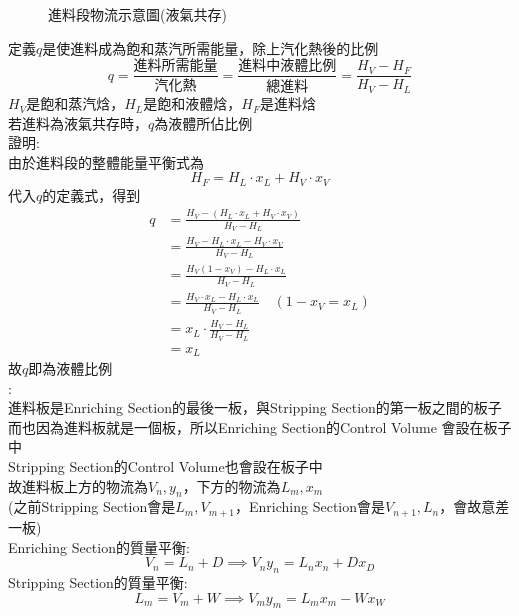 \documentclass[../main.tex]{subfiles}
\begin{document}
\begin{itemize}
\begin{itemize}
\begin{figure}[H]
      \caption{進料段物流示意圖(液氣共存)}
    \end{figure}
    定義$q$是使進料成為飽和蒸汽所需能量，除上汽化熱後的比例
    \begin{equation}
      q = \frac{\text{進料所需能量}}{\text{汽化熱}} = \frac{\text{進料中液體比例}}{\text{總進料}} = \frac{H_V-H_F}{H_V - H_L}
    \end{equation}
    $H_V$是飽和蒸汽焓，$H_L$是飽和液體焓，$H_F$是進料焓\\
    若進料為液氣共存時，$q$為液體所佔比例\\
    證明:\\
    由於進料段的整體能量平衡式為
    \begin{equation}
      H_F = H_L\cdot x_L + H_V \cdot x_V
    \end{equation}
    代入$q$的定義式，得到
    \begin{align}
      q &= \frac{H_V - (H_L\cdot x_L + H_V \cdot x_V)}{H_V - H_L} \nonumber\\
      &= \frac{H_V - H_L\cdot x_L - H_V \cdot x_V}{H_V - H_L} \nonumber\\
      &= \frac{H_V(1-x_V) - H_L\cdot x_L}{H_V - H_L} \nonumber\\
      &= \frac{H_V\cdot x_L - H_L\cdot x_L}{H_V - H_L} \quad (1-x_V = x_L) \nonumber\\
      &= x_L \cdot \frac{H_V - H_L}{H_V - H_L} \nonumber\\
      &= x_L
    \end{align}
    故$q$即為液體比例\\
    :\\
    進料板是Enriching Section的最後一板，與Stripping Section的第一板之間的板子\\
    而也因為進料板就是一個板，所以Enriching Section的Control Volume 會設在板子中\\
    Stripping Section的Control Volume也會設在板子中\\
    故進料板上方的物流為$V_n,y_n$，下方的物流為$L_m,x_m$\\
    (之前Stripping Section會是$L_{m},V_{m+1}$，Enriching Section會是$V_{n+1},L_n$，會故意差一板)\\
    Enriching Section的質量平衡:
    \begin{equation}
      V_n = L_n + D \implies V_n y_n = L_n x_n + D x_D
    \end{equation}
    Stripping Section的質量平衡:
    \begin{equation}
      L_m = V_m + W \implies V_m y_m = L_m x_m - W x_W

\end{equation}
\end{itemize}
\end{itemize}
\end{document}
